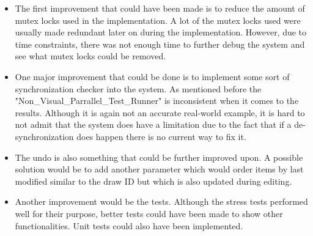 \documentclass[12pt, a4paper]{report}
\begin{document}
\begin{itemize}
    \item The first improvement that could have been made is to reduce the amount of mutex locks used in the implementation. A lot of the mutex locks used were usually made redundant later on during the implementation. However, due to time constraints, there was not enough time to further debug the system and see what mutex locks could be removed.

    \item One major improvement that could be done is to implement some sort of synchronization checker into the system. As mentioned before the "Non\_Visual\_Parrallel\_Test\_Runner" is inconsistent when it comes to the results. Although it is again not an accurate real-world example, it is hard to not admit that the system does have a limitation due to the fact that if a de-synchronization does happen there is no current way to fix it.

    \item The undo is also something that could be further improved upon. A possible solution would be to add another parameter which would order items by last modified similar to the draw ID but which is also updated during editing.

    \item Another improvement would be the tests. Although the stress tests performed well for their purpose, better tests could have been made to show other functionalities. Unit tests could also have been implemented.
\end{itemize}




\end{document}
